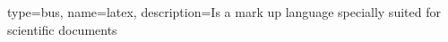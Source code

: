 {
    type=bus,
    name=latex,
    description={Is a mark up language specially suited
    for scientific documents}
}
